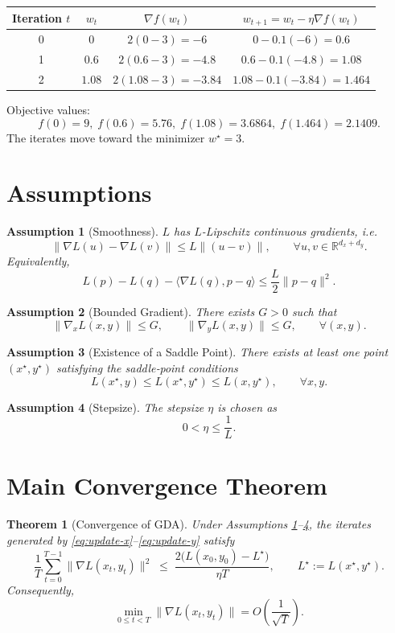 \documentclass[11pt]{article}
\newtheorem{theorem}{Theorem}
\newtheorem{assumption}{Assumption}
\newcommand{\R}{\mathbb{R}}
\begin{document}
\begin{center}
\begin{tabular}{c|c|c|c}
Iteration $t$ & $w_{t}$ & $\nabla f(w_{t})$ & $w_{t+1}=w_{t}-\eta\nabla f(w_{t})$ \\ \hline
0 & $0$ & $2(0-3)=-6$ & $0-0.1(-6)=0.6$ \\
1 & $0.6$ & $2(0.6-3)=-4.8$ & $0.6-0.1(-4.8)=1.08$ \\
2 & $1.08$ & $2(1.08-3)=-3.84$ & $1.08-0.1(-3.84)=1.464$ \\
\end{tabular}
\end{center}
Objective values:
\[
f(0)=9,\; f(0.6)=5.76,\; f(1.08)=3.6864,\; f(1.464)=2.1409.
\]
The iterates move toward the minimizer \(w^{\star}=3\).

\newpage
\section*{Assumptions}
\begin{assumption}[Smoothness]\label{as:smooth}
\(L\) has \(L\)-Lipschitz continuous gradients, i.e.
\[
\big\|\nabla L(u)-\nabla L(v)\big\|
\le L\big\|(u-v)\big\|,\qquad \forall u,v\in\R^{d_{x}+d_{y}}.
\]
Equivalently,
\[
L(p)-L(q)-\langle\nabla L(q),p-q\rangle
\le \frac{L}{2}\|p-q\|^{2}.
\]
\end{assumption}

\begin{assumption}[Bounded Gradient]\label{as:bound}
There exists \(G>0\) such that
\[
\|\nabla_{x}L(x,y)\|\le G,\qquad
\|\nabla_{y}L(x,y)\|\le G,\qquad\forall (x,y).
\]
\end{assumption}

\begin{assumption}[Existence of a Saddle Point]\label{as:saddle}
There exists at least one point \((x^{\star},y^{\star})\) satisfying the saddle‑point conditions
\[
L(x^{\star},y)\le L(x^{\star},y^{\star})\le L(x,y^{\star}),\qquad\forall x,y .
\]
\end{assumption}

\begin{assumption}[Stepsize]\label{as:stepsize}
The stepsize \(\eta\) is chosen as
\[
0<\eta\le \frac{1}{L}.
\]
\end{assumption}

\section*{Main Convergence Theorem}
\begin{theorem}[Convergence of GDA]\label{thm:main}
Under Assumptions \ref{as:smooth}–\ref{as:stepsize}, the iterates generated by \eqref{eq:update-x}–\eqref{eq:update-y} satisfy
\[
\frac{1}{T}\sum_{t=0}^{T-1}\big\|\nabla L(x_{t},y_{t})\big\|^{2}
\;\le\; \frac{2\big(L(x_{0},y_{0})-L^{\star}\big)}{\eta T},
\qquad L^{\star}:=L(x^{\star},y^{\star}).
\]
Consequently,
\[
\min_{0\le t<T}\big\|\nabla L(x_{t},y_{t})\big\|
= O\!\left(\frac{1}{\sqrt{T}}\right).
\]
\end{theorem}
\end{document}
